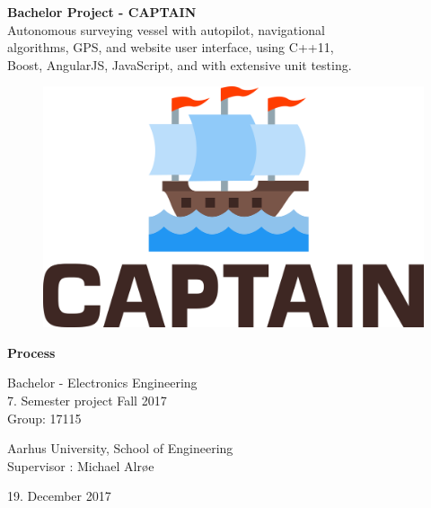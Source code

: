 \begin{titlingpage}
		
	\begin{center}
			{\huge\bfseries Bachelor Project - CAPTAIN}\\
			\vspace{20pt}
			{\large Autonomous surveying vessel with autopilot, navigational\\ algorithms, GPS, and website user interface, using C++11, \\ Boost, AngularJS, JavaScript, and with extensive unit testing.}\\
			
			\vfill
			\begin{figure}[H]
				\centering
				\includegraphics[max width=0.7\linewidth]{logo.png}
			\end{figure}
			
			\vfill
			{\Huge\bfseries Process}\\
			
			
			\vspace{20pt}
			
			{Bachelor - Electronics Engineering}\\
			{\large 7. Semester project Fall 2017}\\
			{Group: 17115}\\
			
			\vspace{10pt}
			
			Aarhus University, School of Engineering\\
			Supervisor : Michael Alrøe
			\vspace{10pt}
			
			19. December 2017


\end{center}
\end{titlingpage}
